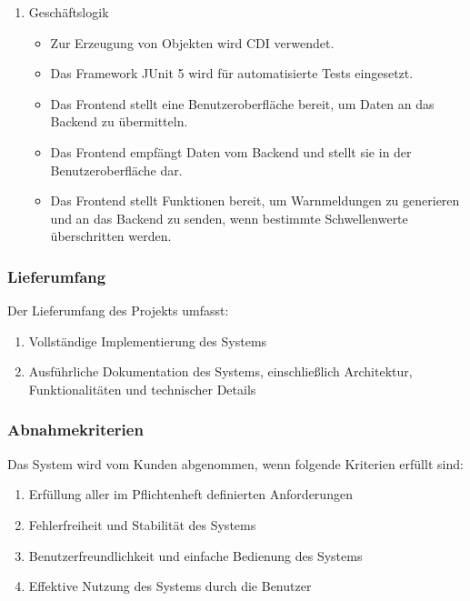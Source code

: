 \begin{enumerate}
\begin{itemize}
			\end{itemize}
		\item Geschäftslogik
			\begin{itemize}
				\item Zur Erzeugung von Objekten wird \acs{CDI} verwendet.
				\item Das Framework JUnit 5 wird für automatisierte Tests eingesetzt.
				\item Das Frontend stellt eine Benutzeroberfläche bereit, um Daten an das Backend zu übermitteln.
				\item Das Frontend empfängt Daten vom Backend und stellt sie in der Benutzeroberfläche dar.
				\item Das Frontend stellt Funktionen bereit, um Warnmeldungen zu generieren und an das Backend zu senden, wenn bestimmte Schwellenwerte überschritten werden.
			\end{itemize}
\end{enumerate}

\subsubsection{Lieferumfang}

Der Lieferumfang des Projekts umfasst:

\begin{enumerate}
\item Vollständige Implementierung des Systems
\item Ausführliche Dokumentation des Systems, einschließlich Architektur, Funktionalitäten und technischer Details
\end{enumerate}

\subsubsection{Abnahmekriterien}

Das System wird vom Kunden abgenommen, wenn folgende Kriterien erfüllt sind:

\begin{enumerate}
\item Erfüllung aller im Pflichtenheft definierten Anforderungen
\item Fehlerfreiheit und Stabilität des Systems
\item Benutzerfreundlichkeit und einfache Bedienung des Systems
\item Effektive Nutzung des Systems durch die Benutzer
\end{enumerate}



